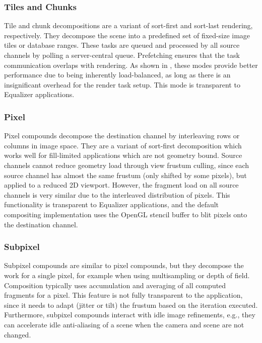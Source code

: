 \documentclass[journal]{vgtc}                %
\begin{document}
\subsubsection{Tiles and Chunks}

Tile and chunk decompositions are a variant of sort-first and sort-last
rendering, respectively. They decompose the scene into a predefined set of
fixed-size image tiles or database ranges. These tasks are queued and processed
by all source channels by polling a server-central queue. Prefetching ensures
that the task communication overlaps with rendering. As shown in \cite{SPEP:16},
these modes provide better performance due to being inherently load-balanced, as
long as there is an insignificant overhead for the render task setup. This mode
is transparent to Equalizer applications.

\subsubsection{Pixel}

Pixel compounds decompose the destination channel by interleaving rows or
columns in image space. They are a variant of sort-first decomposition which
works well for fill-limited applications which are not geometry bound. Source
channels cannot reduce geometry load through view frustum culling, since each
source channel has almost the same frustum (only shifted by some pixels),
but applied to a reduced 2D viewport. However, the fragment load on all source
channels is very similar due to the interleaved distribution of pixels. This
functionality is transparent to Equalizer applications, and the default
compositing implementation uses the OpenGL stencil buffer to blit pixels onto
the destination channel.

\subsubsection{Subpixel}

Subpixel compounds are similar to pixel compounds, but they decompose the work
for a single pixel, for example when using multisampling or depth of
field. Composition typically uses accumulation and averaging of all computed
fragments for a pixel. This feature is not fully transparent to the application,
since it needs to adapt (jitter or tilt) the frustum based on the iteration
executed. Furthermore, subpixel compounds interact with idle image refinements,
e.g., they can accelerate idle anti-aliasing of a scene when the camera and
scene are not changed.
\end{document}
